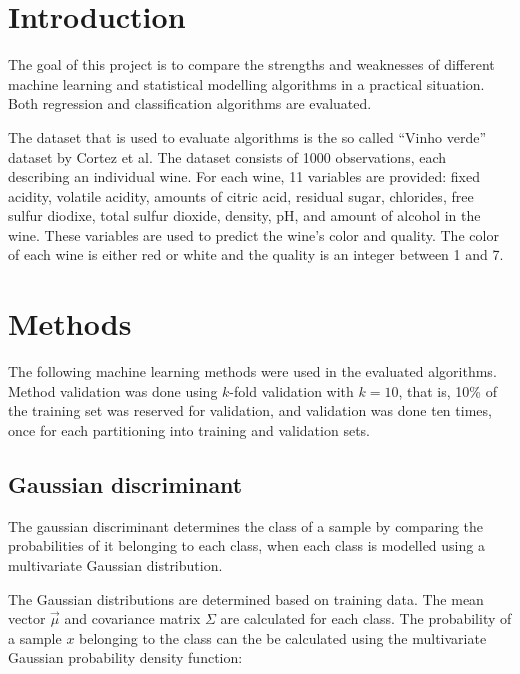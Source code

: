 \documentclass[twoside]{article}
\renewcommand{\v}[1]{\vec{#1}}
\begin{document}
\begin{multicols}{2} %

\section{Introduction}

The goal of this project is to compare the strengths and weaknesses of different machine learning
and statistical modelling algorithms in a practical situation. Both regression and classification
algorithms are evaluated.

The dataset that is used to evaluate algorithms is the so called ``Vinho verde'' dataset by Cortez et al\cite{CorCer09}.
The dataset consists of 1000 observations, each describing an individual wine. For each wine, 11 variables are provided:
fixed acidity, volatile acidity, amounts of citric acid, residual sugar, chlorides, free sulfur diodixe, total sulfur dioxide,
density, pH, and amount of alcohol in the wine. These variables are used to predict the wine's color and quality.
The color of each wine is either red or white and the quality is an integer between 1 and 7.


\section{Methods}

The following machine learning methods were used in the evaluated algorithms.
Method validation was done using $k$-fold validation with $k = 10$,
that is, 10\% of the training set was reserved for validation, and validation
was done ten times, once for each partitioning into training and validation sets.

\subsection{Gaussian discriminant}

The gaussian discriminant determines the class of a sample by
comparing the probabilities of it belonging to each class, when each
class is modelled using a multivariate Gaussian distribution.

The Gaussian distributions are determined based on training data.
The mean vector $\v{\mu}$ and covariance matrix $\Sigma$ are calculated for each class.
The probability of a sample $x$ belonging to the class can the be calculated
using the multivariate Gaussian probability density function:


\end{multicols}
\end{document}
